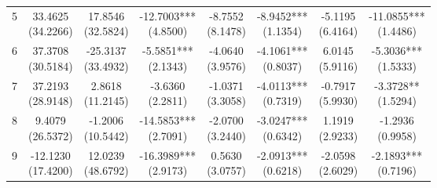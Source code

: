\begin{table}[!htbp]
\begin{threeparttable}
\begin{tabular}{@{}lccccccc@{}}
5 & \shortstack{33.4625\\(34.2266)} & \shortstack{17.8546\\(32.5824)} & \shortstack{-12.7003***\\(4.8500)} & \shortstack{-8.7552\\(8.1478)} & \shortstack{-8.9452***\\(1.1354)} & \shortstack{-5.1195\\(6.4164)} & \shortstack{-11.0855***\\(1.4486)} \\
6 & \shortstack{37.3708\\(30.5184)} & \shortstack{-25.3137\\(33.4932)} & \shortstack{-5.5851***\\(2.1343)} & \shortstack{-4.0640\\(3.9576)} & \shortstack{-4.1061***\\(0.8037)} & \shortstack{6.0145\\(5.9116)} & \shortstack{-5.3036***\\(1.5333)} \\
7 & \shortstack{37.2193\\(28.9148)} & \shortstack{2.8618\\(11.2145)} & \shortstack{-3.6360\\(2.2811)} & \shortstack{-1.0371\\(3.3058)} & \shortstack{-4.0113***\\(0.7319)} & \shortstack{-0.7917\\(5.9930)} & \shortstack{-3.3728**\\(1.5294)} \\
8 & \shortstack{9.4079\\(26.5372)} & \shortstack{-1.2006\\(10.5442)} & \shortstack{-14.5853***\\(2.7091)} & \shortstack{-2.0700\\(3.2440)} & \shortstack{-3.0247***\\(0.6342)} & \shortstack{1.1919\\(2.9233)} & \shortstack{-1.2936\\(0.9958)} \\
9 & \shortstack{-12.1230\\(17.4200)} & \shortstack{12.0239\\(48.6792)} & \shortstack{-16.3989***\\(2.9173)} & \shortstack{0.5630\\(3.0757)} & \shortstack{-2.0913***\\(0.6218)} & \shortstack{-2.0598\\(2.6029)} & \shortstack{-2.1893***\\(0.7196)} \\

\end{tabular}
\end{threeparttable}
\end{table}
